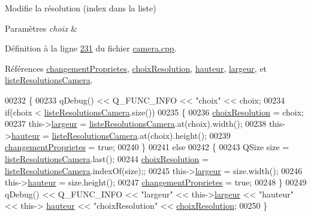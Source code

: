 Modifie la résolution (index dans la liste) 


\begin{DoxyParams}{Paramètres}
{\em choix} & \\
\hline
\end{DoxyParams}


Définition à la ligne \hyperlink{camera_8cpp_source_l00231}{231} du fichier \hyperlink{camera_8cpp_source}{camera.\+cpp}.



Références \hyperlink{camera_8h_source_l00070}{changement\+Proprietes}, \hyperlink{camera_8h_source_l00072}{choix\+Resolution}, \hyperlink{camera_8h_source_l00066}{hauteur}, \hyperlink{camera_8h_source_l00065}{largeur}, et \hyperlink{camera_8h_source_l00071}{liste\+Resolutions\+Camera}.


\begin{DoxyCode}
00232 \{
00233     qDebug() << Q\_FUNC\_INFO << \textcolor{stringliteral}{"choix"} << choix;
00234     \textcolor{keywordflow}{if}(choix < \hyperlink{class_camera_a96af62eaf7828664865b56e7c69e771c}{listeResolutionsCamera}.size())
00235     \{
00236         \hyperlink{class_camera_a3fdddf6f548f04d7bdc26f32602a03d4}{choixResolution} = choix;
00237         this->\hyperlink{class_camera_ad64f26cdfc5aa561208b273d430938cf}{largeur} = \hyperlink{class_camera_a96af62eaf7828664865b56e7c69e771c}{listeResolutionsCamera}.at(choix).width();
00238         this->\hyperlink{class_camera_a5d89d7f9d1a5eab4175dd168c7fbf1c7}{hauteur} = \hyperlink{class_camera_a96af62eaf7828664865b56e7c69e771c}{listeResolutionsCamera}.at(choix).height();
00239         \hyperlink{class_camera_a50d2b3ef5c08f8b61bbe2115d71005bd}{changementProprietes} = \textcolor{keyword}{true};
00240     \}
00241     \textcolor{keywordflow}{else}
00242     \{
00243         QSize size = \hyperlink{class_camera_a96af62eaf7828664865b56e7c69e771c}{listeResolutionsCamera}.last();
00244         \hyperlink{class_camera_a3fdddf6f548f04d7bdc26f32602a03d4}{choixResolution} = \hyperlink{class_camera_a96af62eaf7828664865b56e7c69e771c}{listeResolutionsCamera}.indexOf(size);;
00245         this->\hyperlink{class_camera_ad64f26cdfc5aa561208b273d430938cf}{largeur} = size.width();
00246         this->\hyperlink{class_camera_a5d89d7f9d1a5eab4175dd168c7fbf1c7}{hauteur} = size.height();
00247         \hyperlink{class_camera_a50d2b3ef5c08f8b61bbe2115d71005bd}{changementProprietes} = \textcolor{keyword}{true};
00248     \}
00249     qDebug() << Q\_FUNC\_INFO << \textcolor{stringliteral}{"largeur"} << this->\hyperlink{class_camera_ad64f26cdfc5aa561208b273d430938cf}{largeur} << \textcolor{stringliteral}{"hauteur"} << this->
      \hyperlink{class_camera_a5d89d7f9d1a5eab4175dd168c7fbf1c7}{hauteur} << \textcolor{stringliteral}{"choixResolution"} << \hyperlink{class_camera_a3fdddf6f548f04d7bdc26f32602a03d4}{choixResolution};
00250 \}
\end{DoxyCode}
\mbox{\label{class_camera_ace85018db120a6d61a5326172f97df93}} 
